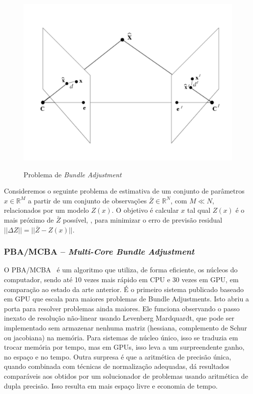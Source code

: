 \newpage

\begin{figure}[!h]
	\centering
  \caption{Problema de \emph{Bundle Adjustment}}
	\includegraphics[width=0.5\linewidth]{figs/bundleAdjustment.png}
  \label{fig:bundleAdjustment}
\end{figure}

Consideremos o seguinte problema de estimativa de um conjunto de parâmetros $x
\in \mathbb{R}^M$ a partir de um conjunto de observações $\bar{Z} \in \mathbb{R}^N$, com
$M \ll N$, relacionados por um modelo $Z(x)$. O objetivo é calcular $x$ tal qual $Z(x)$ é o mais próximo de
$\bar{Z}$ possível, \ie, para minimizar o erro de previsão residual $|| \Delta Z
|| = || \bar{Z} - Z(x) ||$.

\subsubsection{PBA/MCBA -- \emph{Multi-Core Bundle Adjustment}}\label{pba}

O PBA/MCBA~\cite{furukawa2009accurate,wu2011multicore} é um algoritmo que
utiliza, de forma eficiente, os núcleos do computador, sendo até 10 vezes mais
rápido em CPU e 30 vezes em GPU, em comparação ao estado da arte anterior. É o primeiro
sistema publicado baseado em GPU que escala para maiores problemas de Bundle
Adjustments. Isto abriu a porta para resolver problemas ainda maiores. Ele
funciona observando o passo inexato de resolução não-linear usando Levenberg
Mardquardt, que pode ser implementado sem armazenar nenhuma matriz (hessiana,
complemento de Schur ou jacobiana) na memória. Para sistemas de núcleo único,
isso se traduzia em trocar memória por tempo, mas em GPUs, isso leva a um
surpreendente ganho, no espaço e no tempo. Outra surpresa é que a aritmética de
precisão única, quando combinada com técnicas de normalização adequadas, dá
resultados comparáveis aos obtidos por um solucionador de problemas usando
aritmética de dupla precisão. Isso resulta em mais espaço livre e economia de tempo.


